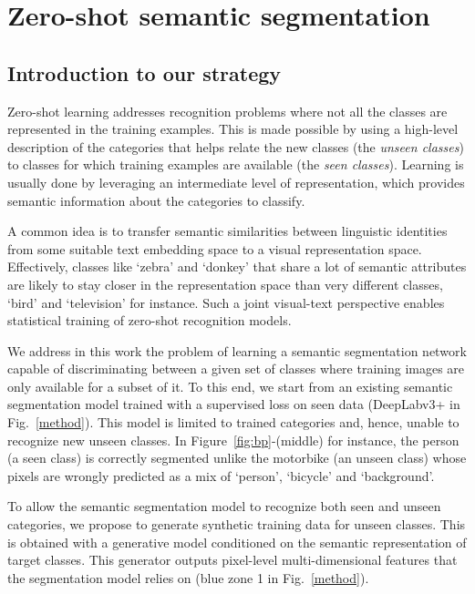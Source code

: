 \documentclass{article}
\begin{document}
 \section{Zero-shot semantic segmentation}

\subsection{Introduction to our strategy}
Zero-shot learning addresses recognition problems where not all the classes are represented in the training examples.
This is made possible by using a high-level description of the categories that helps relate the new classes (the {\em unseen classes}) to classes for which training examples are available (the {\em seen classes}).
Learning is usually done by leveraging an intermediate level of representation, which provides semantic information about the categories to classify.

A common idea is to transfer semantic similarities between linguistic identities from some suitable text embedding space to a visual representation space.
Effectively, classes like `zebra' and `donkey' that share a lot of semantic attributes are likely to stay closer in the representation space than very different classes, `bird' and `television' for instance. Such a joint visual-text perspective enables statistical training of zero-shot recognition models.

We address in this work the problem of learning a semantic segmentation network capable of discriminating between a given set of classes where training images are only available for a subset of it.
To this end, we start from an existing semantic segmentation model trained with a supervised loss on seen data (DeepLabv3+ in Fig.~\ref{method}).
This model is limited to trained categories and, hence, unable to recognize new unseen classes.
In Figure~\ref{fig:bp}-(middle) for instance, 
the person (a seen class) is correctly segmented unlike the motorbike (an unseen class) whose pixels are wrongly predicted as a mix of `person', `bicycle' and `background'.

To allow the semantic segmentation model to recognize both seen and unseen categories, we propose to generate synthetic training data for unseen classes.
This is obtained with a generative model
conditioned on the semantic representation of target classes.
This generator outputs pixel-level multi-dimensional features 
that the segmentation model relies on  (blue zone 1 in Fig.~\ref{method}).
\end{document}
